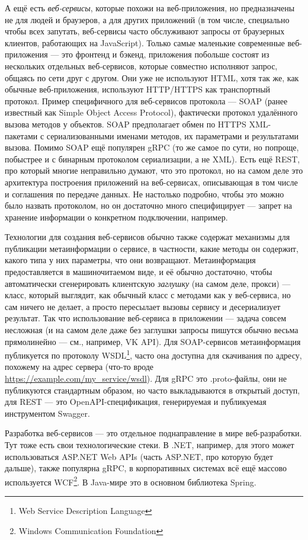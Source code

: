 \documentclass[a5paper]{article}
\begin{document}
А ещё есть \emph{веб-сервисы}, которые похожи на веб-приложения, но предназначены не для людей и браузеров, а для других приложений (в том числе, специально чтобы всех запутать, веб-сервисы часто обслуживают запросы от браузерных клиентов, работающих на JavaScript). Только самые маленькие современные веб-приложения --- это фронтенд и бэкенд, приложения побольше состоят из нескольких отдельных веб-сервисов, которые совместно исполняют запрос, общаясь по сети друг с другом. Они уже не используют HTML, хотя так же, как обычные веб-приложения, используют HTTP/HTTPS как транспортный протокол. Пример специфичного для веб-сервисов протокола --- SOAP (ранее известный как Simple Object Access Protocol), фактически протокол удалённого вызова методов у объектов. SOAP предполагает обмен по HTTPS XML-пакетами с сериализованными именами методов, их параметрами и результатами вызова. Помимо SOAP ещё популярен gRPC (то же самое по сути, но попроще, побыстрее и с бинарным протоколом сериализации, а не XML). Есть ещё REST, про который многие неправильно думают, что это протокол, но на самом деле это архитектура построения приложений на веб-сервисах, описывающая в том числе и соглашения по передаче данных. Не настолько подробно, чтобы это можно было назвать протоколом, но он достаточно много специфицирует --- запрет на хранение информации о конкретном подключении, например.

Технологии для создания веб-сервисов обычно также содержат механизмы для публикации метаинформации о сервисе, в частности, какие методы он содержит, какого типа у них параметры, что они возвращают. Метаинформация предоставляется в машиночитаемом виде, и её обычно достаточно, чтобы автоматически сгенерировать клиентскую \emph{заглушку} (на самом деле, прокси) --- класс, который выглядит, как обычный класс с методами как у веб-сервиса, но сам ничего не делает, а просто пересылает вызовы сервису и десериализует результат. Так что использование веб-сервиса в приложении --- задача совсем несложная (и на самом деле даже без заглушки запросы пишутся обычно весьма прямолинейно --- см., например, VK API). Для SOAP-сервисов метаинформация публикуется по протоколу WSDL\footnote{Web Service Description Language}, часто она доступна для скачивания по адресу, похожему на адрес сервера (что-то вроде \url{https://example.com/my_service/wsdl}). Для gRPC это .proto-файлы, они не публикуются стандартным образом, но часто выкладываются в открытый доступ, для REST --- это OpenAPI-спецификация, генерируемая и публикуемая инструментом Swagger.

Разработка веб-сервисов --- это отдельное поднаправление в мире веб-разработки. Тут тоже есть свои технологические стеки. В .NET, например, для этого может использоваться ASP.NET Web APIs (часть ASP.NET, про которую будет дальше), также популярна gRPC, в корпоративных системах всё ещё массово используется WCF\footnote{Windows Communication Foundation}. В Java-мире это в основном библиотека Spring.
\end{document}
